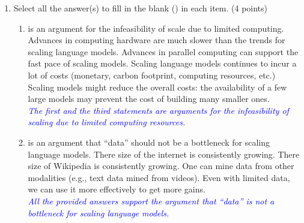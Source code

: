 \documentclass[12pt]{article}
\newcommand{\solution}[2]{\\[2mm] \textcolor{blue}{\em #1}} %
\begin{document}
\begin{enumerate}
\item Select all the answer(s) to fill in the blank (\filler) in each item. (4 points)
\begin{enumerate}
    \item \filler is an argument for the infeasibility of scale due to limited computing. 
    \newline
    \choice{} Advances in computing hardware 
    are much slower than the trends for scaling language models. 
    \newline   
    \choice{} Advances in parallel computing can support the fast pace of scaling 
    models. 
    \newline   
    \choice{} Scaling language models continues to incur a lot of costs (monetary, carbon footprint, computing resources, etc.) 
    \newline   
    \choice{} Scaling models might reduce the overall costs: the availability of a few large models may prevent the cost of building many smaller ones. 
    \newline
    \solution{
        The first and the third statements are arguments for the infeasibility of scaling due to limited computing resources. 
        }{\vspace{0cm}}
        
    \item \filler is an argument that ``data'' should not be a bottleneck for scaling language models. 
    \newline
    \choice{} There size of the internet is consistently growing. 
    \newline   
    \choice{} There size of  Wikipedia is consistently growing. 
    \newline  
    \choice{} One can mine  data from other modalities (e.g., text data mined from videos). 
    \newline   
    \choice{} Even with limited data, we can use it more effectively to get more gains.
    \newline   
    \solution{
        All the provided answers support the argument that   ``data'' is not a bottleneck for scaling language models. 
        }{\vspace{0cm}}
        

\end{enumerate}
\end{enumerate}
\end{document}
